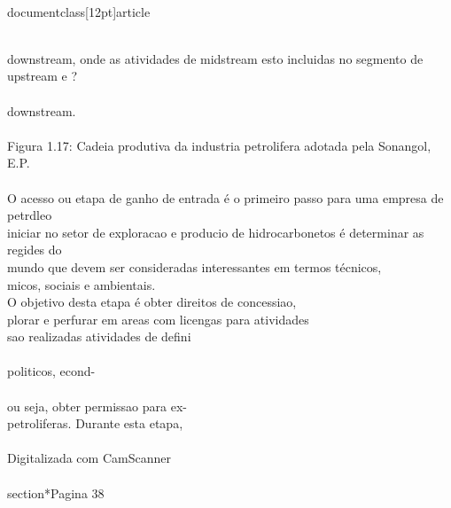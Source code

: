 \\documentclass[12pt]{article}
\begin{document}
\\
downstream, onde as atividades de midstream esto incluidas no segmento de\\
upstream e ?\\
\\
downstream.\\
\\
Figura 1.17: Cadeia produtiva da industria petrolifera adotada pela Sonangol, E.P.\\
\\
O acesso ou etapa de ganho de entrada é o primeiro passo para uma empresa de petrdleo\\
iniciar no setor de exploracao e producio de hidrocarbonetos é determinar as regides do\\
mundo que devem ser consideradas interessantes em termos técnicos,\\
micos, sociais e ambientais.\\
O objetivo desta etapa é obter direitos de concessiao,\\
plorar e perfurar em areas com licengas para atividades\\
sao realizadas atividades de defini\\
\\
politicos, econd-\\
\\
ou seja, obter permissao para ex-\\
petroliferas. Durante esta etapa,\\
\\
Digitalizada com CamScanner\\

\\section*{Pagina 38}
\end{document}

